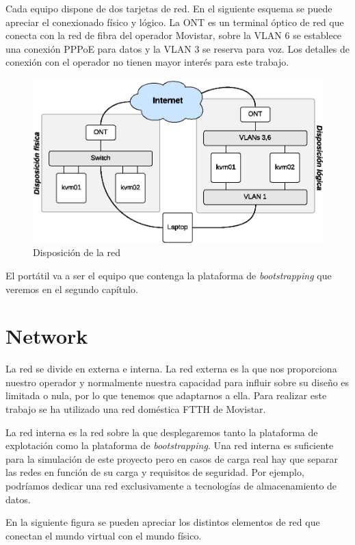 \documentclass[a4paper,12pt,spanish,final]{epsc_tfc_pfc}
\begin{document}
Cada equipo dispone de dos tarjetas de red. En el siguiente esquema se puede apreciar el conexionado físico y lógico. La ONT es un terminal óptico de red que conecta con la red de fibra del operador Movistar, sobre la VLAN 6 se establece una conexión PPPoE para datos y la VLAN 3 se reserva para voz. Los detalles de conexión con el operador no tienen mayor interés para este trabajo.

\begin{figure}[h]
  \centering
    \includegraphics[scale=1]{layout}
      \caption{Disposición de la red}
\end{figure}

El portátil va a ser el equipo que contenga la plataforma de \emph{bootstrapping} que veremos en el segundo capítulo.

\section{Network}

La red se divide en externa e interna. La red externa es la que nos proporciona nuestro operador y normalmente nuestra capacidad para influir sobre su diseño es limitada o nula, por lo que tenemos que adaptarnos a ella. Para realizar este trabajo se ha utilizado una red doméstica FTTH de Movistar.

La red interna es la red sobre la que desplegaremos tanto la plataforma de explotación como la plataforma de \emph{bootstrapping}. Una red interna es suficiente para la simulación de este proyecto pero en casos de carga real hay que separar las redes en función de su carga y requisitos de seguridad. Por ejemplo, podríamos dedicar una red exclusivamente a tecnologías de almacenamiento de datos.

En la siguiente figura se pueden apreciar los distintos elementos de red que conectan el mundo virtual con el mundo físico.
\end{document}

